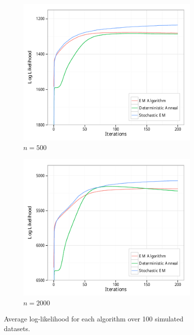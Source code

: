 \documentclass{article}
\theoremstyle{definition}
\theoremstyle{algodesc}
\begin{document}
\begin{figure}[htb] \centering
  \begin{subfigure}[t]{.45\linewidth}
    \includegraphics[width=\linewidth]{include/avg_lik_500.pdf}
    \caption{$n=500$} \label{fig:sims_n500}
  \end{subfigure}
  \begin{subfigure}[t]{.45\linewidth}
    \includegraphics[width=\linewidth]{include/avg_lik_2000.pdf}
    \caption{$n=2000$} \label{fig:sims_n2000}
  \end{subfigure}
  \caption{Average log-likelihood for each algorithm over 100 simulated datasets.}
  \label{fig:sims}
\end{figure}
\end{document}
